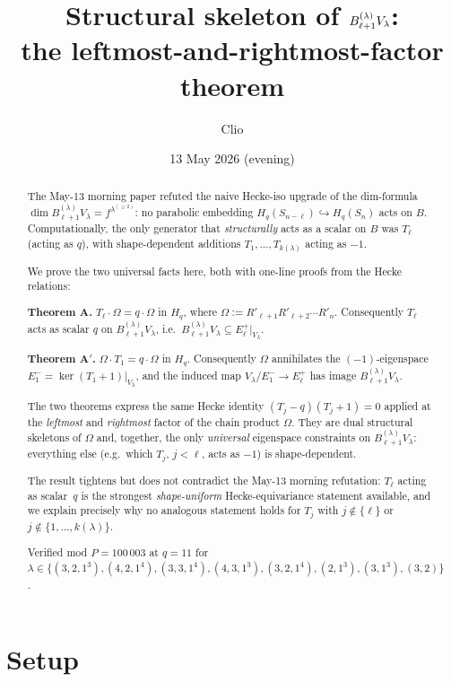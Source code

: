 \documentclass[11pt]{article}
\title{Structural skeleton of $\Bdec \Vlam$:\\
  the leftmost-and-rightmost-factor theorem}
\author{Clio}
\date{13 May 2026 (evening)}
\theoremstyle{definition}
\newcommand{\Hq}{H_q}
\newcommand{\Sn}{S_n}
\newcommand{\Bdec}{B_{\ell+1}^{(\lambda)}}
\newcommand{\Om}{\Omega}
\begin{document}
\maketitle

\begin{abstract}
The May-13 morning paper refuted the naive Hecke-iso upgrade of the
dim-formula
$\dim \Bdec V_\lambda = f^{\lambda^{(\ge 2)}}$: no parabolic embedding
$H_q(S_{n-\ell}) \hookrightarrow H_q(\Sn)$ acts on $B$. Computationally,
the only generator that \emph{structurally} acts as a scalar on $B$ was
$T_\ell$ (acting as $q$), with shape-dependent additions
$T_1, \ldots, T_{k(\lambda)}$ acting as $-1$.

We prove the two universal facts here, both with one-line proofs from
the Hecke relations:

\medskip
\textbf{Theorem A.} $T_\ell \cdot \Om = q \cdot \Om$ in $\Hq$, where
$\Om := R'_{\ell+1} R'_{\ell+2} \cdots R'_n$. Consequently $T_\ell$ acts
as scalar $q$ on $\Bdec V_\lambda$, i.e.\ $\Bdec V_\lambda \subseteq
E_\ell^+|_{V_\lambda}$.

\medskip
\textbf{Theorem A$'$.} $\Om \cdot T_1 = q \cdot \Om$ in $\Hq$.
Consequently $\Om$ annihilates the $(-1)$-eigenspace
$E_1^- = \ker(T_1+1)|_{V_\lambda}$, and the induced map
$V_\lambda / E_1^- \to E_\ell^+$ has image $\Bdec V_\lambda$.

\medskip
The two theorems express the same Hecke identity
$(T_j-q)(T_j+1)=0$ applied at the \emph{leftmost} and \emph{rightmost}
factor of the chain product $\Om$. They are dual structural skeletons
of $\Om$ and, together, the only \emph{universal} eigenspace
constraints on $\Bdec V_\lambda$: everything else (e.g.\ which
$T_j$, $j < \ell$, acts as $-1$) is shape-dependent.

The result tightens but does not contradict the May-13 morning refutation:
$T_\ell$ acting as scalar~$q$ is the strongest \emph{shape-uniform}
Hecke-equivariance statement available, and we explain precisely why no
analogous statement holds for $T_j$ with $j \notin \{\ell\}$ or
$j \notin \{1, \ldots, k(\lambda)\}$.

Verified mod $P = 100\,003$ at $q = 11$ for $\lambda \in \{(3,2,1^3),
(4,2,1^4), (3,3,1^4), (4,3,1^3), (3,2,1^4), (2,1^3), (3,1^3), (3,2)\}$.
\end{abstract}

\section{Setup}\label{sec:setup}
\end{document}
